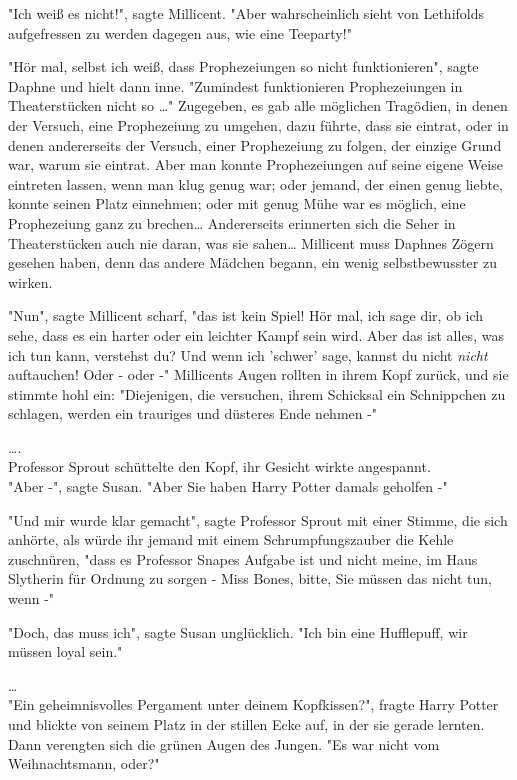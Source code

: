 {"Ich weiß es nicht!", sagte Millicent. "Aber wahrscheinlich sieht von Lethifolds aufgefressen zu werden dagegen aus, wie eine Teeparty!"

"Hör mal, selbst ich weiß, dass Prophezeiungen so nicht funktionieren", sagte Daphne und hielt dann inne. "Zumindest funktionieren Prophezeiungen in Theaterstücken nicht so …" Zugegeben, es gab alle möglichen Tragödien, in denen der Versuch, eine Prophezeiung zu umgehen, dazu führte, dass sie eintrat, oder in denen andererseits der Versuch, einer Prophezeiung zu folgen, der einzige Grund war, warum sie eintrat. Aber man konnte Prophezeiungen auf seine eigene Weise eintreten lassen, wenn man klug genug war; oder jemand, der einen genug liebte, konnte seinen Platz einnehmen; oder mit genug Mühe war es möglich, eine Prophezeiung ganz zu brechen… Andererseits erinnerten sich die Seher in Theaterstücken auch nie daran, was sie sahen… Millicent muss Daphnes Zögern gesehen haben, denn das andere Mädchen begann, ein wenig selbstbewusster zu wirken.

"Nun", sagte Millicent scharf, "das ist kein Spiel! Hör mal, ich sage dir, ob ich sehe, dass es ein harter oder ein leichter Kampf sein wird. Aber das ist alles, was ich tun kann, verstehst du? Und wenn ich 'schwer' sage, kannst du nicht \emph{nicht} auftauchen! Oder - oder -" Millicents Augen rollten in ihrem Kopf zurück, und sie stimmte hohl ein: "Diejenigen, die versuchen, ihrem Schicksal ein Schnippchen zu schlagen, werden ein trauriges und düsteres Ende nehmen -"

….\\ Professor Sprout schüttelte den Kopf, ihr Gesicht wirkte angespannt.\\ "Aber -", sagte Susan. "Aber Sie haben Harry Potter damals geholfen -"

"Und mir wurde klar gemacht", sagte Professor Sprout mit einer Stimme, die sich anhörte, als würde ihr jemand mit einem Schrumpfungszauber die Kehle zuschnüren, "dass es Professor Snapes Aufgabe ist und nicht meine, im Haus Slytherin für Ordnung zu sorgen - Miss Bones, bitte, Sie müssen das nicht tun, wenn -"

"Doch, das muss ich", sagte Susan unglücklich. "Ich bin eine Hufflepuff, wir müssen loyal sein."

…\\ "Ein geheimnisvolles Pergament unter deinem Kopfkissen?", fragte Harry Potter und blickte von seinem Platz in der stillen Ecke auf, in der sie gerade lernten. Dann verengten sich die grünen Augen des Jungen. "Es war nicht vom Weihnachtsmann, oder?"

}
